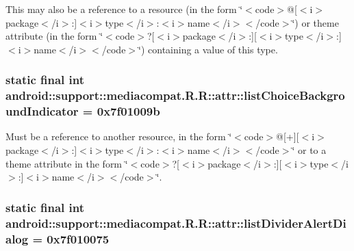 This may also be a reference to a resource (in the form \char`\"{}$<$code$>$@\mbox{[}$<$i$>$package$<$/i$>$:\mbox{]}$<$i$>$type$<$/i$>$:$<$i$>$name$<$/i$>$$<$/code$>$\char`\"{}) or theme attribute (in the form \char`\"{}$<$code$>$?\mbox{[}$<$i$>$package$<$/i$>$:\mbox{]}\mbox{[}$<$i$>$type$<$/i$>$:\mbox{]}$<$i$>$name$<$/i$>$$<$/code$>$\char`\"{}) containing a value of this type. \hypertarget{classandroid_1_1support_1_1mediacompat_1_1_r_1_1attr_fa1229d90aeffd77757f9878cb8be086}{
\subsubsection[{listChoiceBackgroundIndicator}]{\setlength{\rightskip}{0pt plus 5cm}static final int android::support::mediacompat.R.R::attr::listChoiceBackgroundIndicator = 0x7f01009b}}
\label{classandroid_1_1support_1_1mediacompat_1_1_r_1_1attr_fa1229d90aeffd77757f9878cb8be086}


Must be a reference to another resource, in the form \char`\"{}$<$code$>$@\mbox{[}+\mbox{]}\mbox{[}$<$i$>$package$<$/i$>$:\mbox{]}$<$i$>$type$<$/i$>$:$<$i$>$name$<$/i$>$$<$/code$>$\char`\"{} or to a theme attribute in the form \char`\"{}$<$code$>$?\mbox{[}$<$i$>$package$<$/i$>$:\mbox{]}\mbox{[}$<$i$>$type$<$/i$>$:\mbox{]}$<$i$>$name$<$/i$>$$<$/code$>$\char`\"{}. \hypertarget{classandroid_1_1support_1_1mediacompat_1_1_r_1_1attr_ed55716060ca762254b9c6e39a37a392}{
\subsubsection[{listDividerAlertDialog}]{\setlength{\rightskip}{0pt plus 5cm}static final int android::support::mediacompat.R.R::attr::listDividerAlertDialog = 0x7f010075}}
\label{classandroid_1_1support_1_1mediacompat_1_1_r_1_1attr_ed55716060ca762254b9c6e39a37a392}


